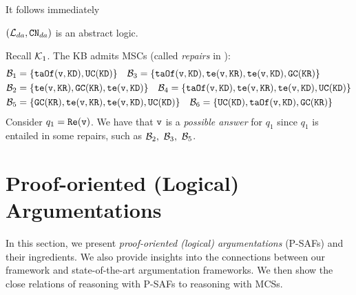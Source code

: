 It follows immediately

\begin{lemma}
    $(\mL_{da}, \cn_{da})$ is an abstract logic.
\end{lemma}

\begin{example} 
\label{ex:motivation} Recall $\mK_1$.
The KB admits MSCs (called \emph{repairs} in \datalogPM):
\begin{align*}
        & \mB_1 =  \{ \teAs(\vi,\kd), \uc(\kd) \}  \quad 
          \mB_3 = \{\teAs(\vi,\kd), \te(\vi,\kr), \te(\vi, \kd), \gc(\kr) \}\\
        & \mB_2 = \{\te(\vi,\kr), \gc(\kr), \te(\vi, \kd) \}  \quad
        \mB_4 = \{\teAs(\vi,\kd), \te(\vi,\kr), \te(\vi, \kd), \uc(\kd) \} \\
       & \mB_5 = \{\gc(\kr) , \te(\vi,\kr), \te(\vi, \kd), \uc(\kd) \}
         \quad
        \mB_6 = \{\uc(\kd), \teAs(\vi, \kd), \gc(\kr) \}
    \end{align*}
Consider $q_1 = \rese(\vi)$. We have that $\vi$ is a \emph{possible answer} for $q_1$ since $q_1$ is entailed in some repairs, such as $\mB_2,\ \mB_3,\ \mB_5$.
\end{example}

\section{Proof-oriented (Logical) Argumentations}
\label{sec:proof-arg}
In this section, we present \emph{proof-oriented (logical) argumentations} (P-SAFs) and their ingredients. We also provide insights into the connections between our framework and state-of-the-art argumentation frameworks. We then show the close relations of reasoning with P-SAFs to
reasoning with MCSs. 

